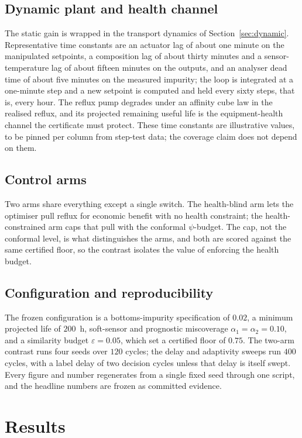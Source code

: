 \documentclass[review,12pt]{elsarticle}
\begin{document}
\subsection{Dynamic plant and health channel}
The static gain is wrapped in the transport dynamics of Section~\ref{sec:dynamic}. Representative
time constants are an actuator lag of about one minute on the manipulated setpoints, a
composition lag of about thirty minutes and a sensor-temperature lag of about fifteen minutes on
the outputs, and an analyser dead time of about five minutes on the measured impurity; the loop
is integrated at a one-minute step and a new setpoint is computed and held every sixty steps,
that is, every hour. The reflux pump degrades under an affinity cube law in the realised reflux,
and its projected remaining useful life is the equipment-health channel the certificate must
protect. These time constants are illustrative values, to be pinned per column from step-test
data; the coverage claim does not depend on them.

\subsection{Control arms}
Two arms share everything except a single switch. The health-blind arm lets the optimiser pull
reflux for economic benefit with no health constraint; the health-constrained arm caps that pull
with the conformal $\psi$-budget. The cap, not the conformal level, is what distinguishes the
arms, and both are scored against the same certified floor, so the contrast isolates the value of
enforcing the health budget.

\subsection{Configuration and reproducibility}
The frozen configuration is a bottoms-impurity specification of $0.02$, a minimum projected life
of $200$~h, soft-sensor and prognostic miscoverage $\alpha_1=\alpha_2=0.10$, and a similarity
budget $\varepsilon=0.05$, which set a certified floor of $0.75$. The two-arm contrast runs four
seeds over $120$ cycles; the delay and adaptivity sweeps run $400$ cycles, with a label delay of
two decision cycles unless that delay is itself swept. Every figure and number regenerates from a
single fixed seed through one script, and the headline numbers are frozen as committed evidence.
\section{Results}
\label{sec:results}
\end{document}
